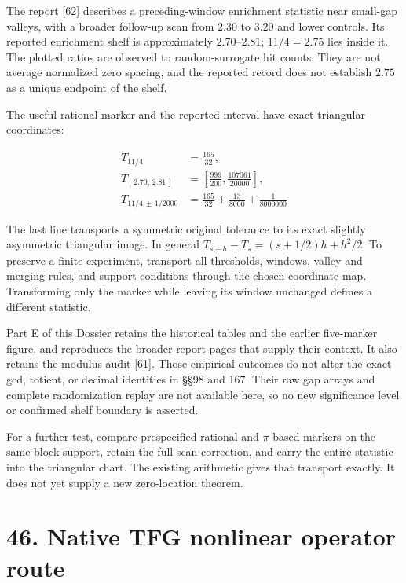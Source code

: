 \documentclass[
  11pt,
]{book}
\begin{document}
The report {[}62{]} describes a preceding-window enrichment statistic
near small-gap valleys, with a broader follow-up scan from \(2.30\) to
\(3.20\) and lower controls. Its reported enrichment shelf is
approximately \(2.70\)--\(2.81\); \(11/4=2.75\) lies inside it. The
plotted ratios are observed to random-surrogate hit counts. They are not
average normalized zero spacing, and the reported record does not
establish \(2.75\) as a unique endpoint of the shelf.

The useful rational marker and the reported interval have exact
triangular coordinates:

\[
\begin{aligned}
T_{11/4}&=\frac{165}{32},\\
T_{[\,2.70,\,2.81\,]}&=
\left[\frac{999}{200},\frac{107061}{20000}\right],\\
T_{11/4\,\pm\,1/2000}
&=\frac{165}{32}\pm\frac{13}{8000}+\frac1{8000000}
\end{aligned}
\tag{168.6}
\]

The last line transports a symmetric original tolerance to its exact
slightly asymmetric triangular image. In general
\(T_{s+h}-T_s=(s+1/2)h+h^2/2\). To preserve a finite experiment,
transport all thresholds, windows, valley and merging rules, and support
conditions through the chosen coordinate map. Transforming only the
marker while leaving its window unchanged defines a different statistic.

Part E of this Dossier retains the historical tables and the earlier
five-marker figure, and reproduces the broader report pages that supply
their context. It also retains the modulus audit {[}61{]}. Those
empirical outcomes do not alter the exact gcd, totient, or decimal
identities in §§98 and 167. Their raw gap arrays and complete
randomization replay are not available here, so no new significance
level or confirmed shelf boundary is asserted.

For a further test, compare prespecified rational and \(\pi\)-based
markers on the same block support, retain the full scan correction, and
carry the entire statistic into the triangular chart. The existing
arithmetic gives that transport exactly. It does not yet supply a new
zero-location theorem.

\section{46. Native TFG nonlinear operator
route}\label{native-tfg-nonlinear-operator-route}
\end{document}
